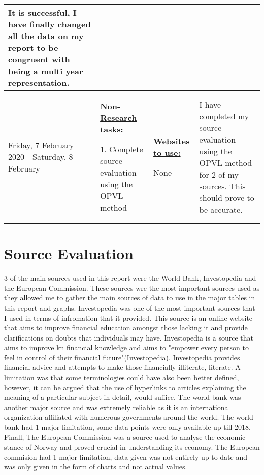 \documentclass[11pt, a4paper]{article}
\begin{document}
\begin{landscape}
\begin{longtable}{|m{2.5cm}|m{6.6cm}|m{6.6cm}|m{9.41cm}|}
				It is successful, I have finally changed all the data on my report to be congruent with being a multi year representation.
				
				\\
				\hline

				
				Friday, 7 February 2020 - Saturday, 8 February

				&
				
				\textbf{\underline{Non-Research tasks:}}
				
				1. Complete source evaluation using the OPVL method

			  	& 
		 	
				\textbf{\underline{Websites to use:}}
				\newline
			
				None
				
				&
				
				I have completed my source evaluation using the OPVL method for 2 of my sources. This should prove to be accurate.
				
				\\
				
			\end{longtable}
	\end{landscape}
	
	\section{Source Evaluation}
	
	3 of the main sources used in this report were the World Bank, Investopedia and the European Commission. These sources wre the most important sources used as they allowed me to gather the main sources of data to use in the major tables in this report and graphs. Investopedia was one of the most important sources that I used in terms of infromation that it provided. This source is an online website that aims to improve financial education amongst those lacking it and provide clarifications on doubts that individuals may have. Investopedia is a source that aims to improve kn financial knowledge and aims to "empower every person to feel in control of their financial future"(Investopedia). Investopedia provides financial advice and attempts to make those financially illiterate, literate. A limitation was that some terminologies could have also been better defined, however, it can be argued that the use of hyperlinks to articles explaining the meaning of a particular subject in detail, would suffice. The world bank was another major source and was extremely reliable as it is an international organization affiliated with numerous governments around the world. The world bank had 1 major limitation, some data points were only available up till 2018. Finall, The European Commission was a source used to analyse the economic stance of Norway and proved crucial in understanding its economy. The European commision had 1 major limitation, data given was not entirely up to date and was only given in the form of charts and not actual values.


	\newpage
	\nocite{*}
	\printbibliography
\end{document}
